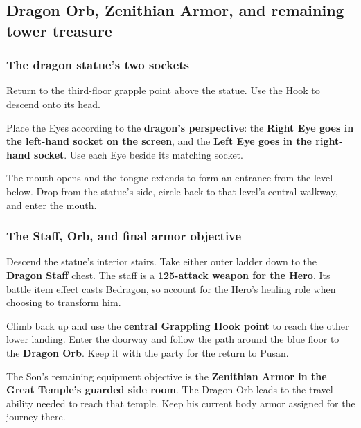 \subsection{Dragon Orb, Zenithian Armor, and remaining tower treasure}

\subsubsection*{The dragon statue's two sockets}

Return to the third-floor grapple point above the statue.
Use the Hook to descend onto its head.

Place the Eyes according to the \textbf{dragon's perspective}:
the \textbf{Right Eye goes in the left-hand socket on the screen},
and the \textbf{Left Eye goes in the right-hand socket}.
Use each Eye beside its matching socket.

The mouth opens and the tongue extends to form an entrance
from the level below. Drop from the statue's side, circle
back to that level's central walkway, and enter the mouth.

\subsubsection*{The Staff, Orb, and final armor objective}

Descend the statue's interior stairs. Take either outer ladder
down to the \textbf{Dragon Staff} chest. The staff is a
\textbf{125-attack weapon for the Hero}. Its battle item
effect casts Bedragon, so account for the Hero's healing role
when choosing to transform him.


Climb back up and use the \textbf{central Grappling Hook point}
to reach the other lower landing. Enter the doorway and follow
the path around the blue floor to the \textbf{Dragon Orb}.
Keep it with the party for the return to Pusan.

The Son's remaining equipment objective is the
\textbf{Zenithian Armor in the Great Temple's guarded side room}.
The Dragon Orb leads to the travel ability needed to reach
that temple. Keep his current body armor assigned for the
journey there.

